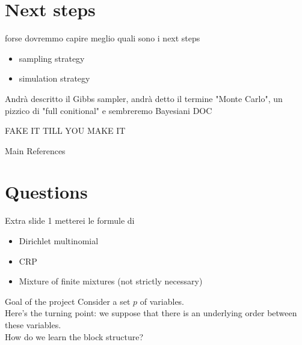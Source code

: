 \section{Next steps}
\begin{frame}

forse dovremmo capire meglio quali sono i next steps

\begin{itemize}
    \item sampling strategy
    \item simulation strategy
\end{itemize}


Andrà descritto il Gibbs sampler, andrà detto il termine "Monte Carlo", un pizzico di "full conitional" e sembreremo Bayesiani DOC

\centering \Huge FAKE IT TILL YOU MAKE IT
\end{frame}





\begin{frame}{Main References}
       \nocite{*}
        
        
\end{frame}

\section*{Questions}


\begin{frame}{Extra slide 1}
metterei le formule di 
\begin{itemize}
    \item Dirichlet multinomial
    \item CRP
    \item Mixture of finite mixtures (not strictly necessary)

    

\end{itemize} 
\end{frame}




\begin{frame}
    {Goal of the project}
    Consider a set $p$ of variables.\\
    Here's the turning point: we suppose that there is an underlying order between these variables.\\
    How do we learn the block structure?
\end{frame}

